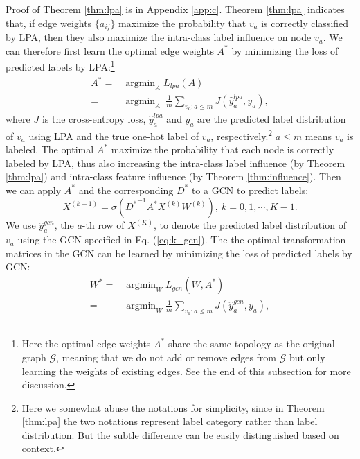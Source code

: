 \documentclass{article}
\begin{document}
		Proof of Theorem \ref{thm:lpa} is in Appendix \ref{app:c}.
		Theorem \ref{thm:lpa} indicates that, if edge weights $\{a_{ij}\}$ maximize the probability that $v_a$ is correctly classified by LPA, then they also maximize the intra-class label influence on node $v_a$.
		We can therefore first learn the optimal edge weights $A^*$ by minimizing the loss of predicted labels by LPA:\footnote{Here the optimal edge weights $A^*$ share the same topology as the original graph $\mathcal G$, meaning that we do not add or remove edges from $\mathcal G$ but only learning the weights of existing edges. See the end of this subsection for more discussion.}
		\begin{equation}
		\begin{split}
			A^* =& \mathop{\arg\min}_A L_{lpa}(A)\\
			=& \mathop{\arg\min}_A \ \frac{1}{m} \sum_{v_a: a \leq m} J(\hat y_a^{lpa}, y_a),
		\end{split}
		\end{equation}
		where $J$ is the cross-entropy loss, $\hat y_a^{lpa}$ and $y_a$ are the predicted label distribution of $v_a$ using LPA and the true one-hot label of $v_a$, respectively.\footnote{Here we somewhat abuse the notations for simplicity, since in Theorem \ref{thm:lpa} the two notations represent label category rather than label distribution. But the subtle difference can be easily distinguished based on context.}
		$a \leq m$ means $v_a$ is labeled.
		The optimal $A^*$ maximize the probability that each node is correctly labeled by LPA, thus also increasing the intra-class label influence (by Theorem \ref{thm:lpa}) and intra-class feature influence (by Theorem \ref{thm:influence}).
		Then we can apply $A^*$ and the corresponding $D^*$ to a GCN to predict labels:
		\begin{equation}
			\label{eq:k_gcn}
			X^{(k+1)} = \sigma ({D^*}^{-1} A^* X^{(k)} W^{(k)}), \ k = 0, 1,\cdots, K-1.
		\end{equation}
		We use $\hat y_a^{gcn}$, the $a$-th row of $X^{(K)}$, to denote the predicted label distribution of $v_a$ using the GCN specified in Eq. (\ref{eq:k_gcn}).
		The the optimal transformation matrices in the GCN can be learned by minimizing the loss of predicted labels by GCN:
		\begin{equation}
		\begin{split}
			W^* =& \mathop{\arg\min}_W L_{gcn}(W, A^*)\\
			=& \mathop{\arg\min}_W \frac{1}{m} \sum_{v_a: a \leq m} J(\hat y_a^{gcn}, y_a),
		\end{split}
		\end{equation}
		
\end{document}
